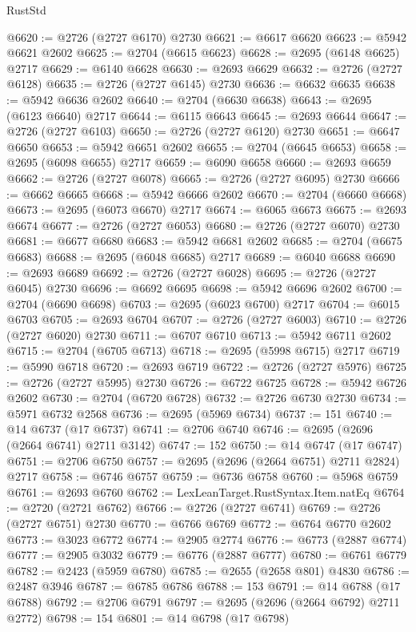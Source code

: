 \begin{lexlean}{RustStd}
\begin{coremodule}
@6620 := @2726 (@2727 @6170) @2730
@6621 := @6617 @6620
@6623 := @5942 @6621 @2602
@6625 := @2704 (@6615 @6623)
@6628 := @2695 (@6148 @6625) @2717
@6629 := @6140 @6628
@6630 := @2693 @6629
@6632 := @2726 (@2727 @6128)
@6635 := @2726 (@2727 @6145) @2730
@6636 := @6632 @6635
@6638 := @5942 @6636 @2602
@6640 := @2704 (@6630 @6638)
@6643 := @2695 (@6123 @6640) @2717
@6644 := @6115 @6643
@6645 := @2693 @6644
@6647 := @2726 (@2727 @6103)
@6650 := @2726 (@2727 @6120) @2730
@6651 := @6647 @6650
@6653 := @5942 @6651 @2602
@6655 := @2704 (@6645 @6653)
@6658 := @2695 (@6098 @6655) @2717
@6659 := @6090 @6658
@6660 := @2693 @6659
@6662 := @2726 (@2727 @6078)
@6665 := @2726 (@2727 @6095) @2730
@6666 := @6662 @6665
@6668 := @5942 @6666 @2602
@6670 := @2704 (@6660 @6668)
@6673 := @2695 (@6073 @6670) @2717
@6674 := @6065 @6673
@6675 := @2693 @6674
@6677 := @2726 (@2727 @6053)
@6680 := @2726 (@2727 @6070) @2730
@6681 := @6677 @6680
@6683 := @5942 @6681 @2602
@6685 := @2704 (@6675 @6683)
@6688 := @2695 (@6048 @6685) @2717
@6689 := @6040 @6688
@6690 := @2693 @6689
@6692 := @2726 (@2727 @6028)
@6695 := @2726 (@2727 @6045) @2730
@6696 := @6692 @6695
@6698 := @5942 @6696 @2602
@6700 := @2704 (@6690 @6698)
@6703 := @2695 (@6023 @6700) @2717
@6704 := @6015 @6703
@6705 := @2693 @6704
@6707 := @2726 (@2727 @6003)
@6710 := @2726 (@2727 @6020) @2730
@6711 := @6707 @6710
@6713 := @5942 @6711 @2602
@6715 := @2704 (@6705 @6713)
@6718 := @2695 (@5998 @6715) @2717
@6719 := @5990 @6718
@6720 := @2693 @6719
@6722 := @2726 (@2727 @5976)
@6725 := @2726 (@2727 @5995) @2730
@6726 := @6722 @6725
@6728 := @5942 @6726 @2602
@6730 := @2704 (@6720 @6728)
@6732 := @2726 @6730 @2730
@6734 := @5971 @6732 @2568
@6736 := @2695 (@5969 @6734)
@6737 := 151
@6740 := @14 @6737 (@17 @6737)
@6741 := @2706 @6740
@6746 := @2695 (@2696 (@2664 @6741) @2711 @3142)
@6747 := 152
@6750 := @14 @6747 (@17 @6747)
@6751 := @2706 @6750
@6757 := @2695 (@2696 (@2664 @6751) @2711 @2824) @2717
@6758 := @6746 @6757
@6759 := @6736 @6758
@6760 := @5968 @6759
@6761 := @2693 @6760
@6762 := LexLeanTarget.RustSyntax.Item.natEq
@6764 := @2720 (@2721 @6762)
@6766 := @2726 (@2727 @6741)
@6769 := @2726 (@2727 @6751) @2730
@6770 := @6766 @6769
@6772 := @6764 @6770 @2602
@6773 := @3023 @6772
@6774 := @2905 @2774
@6776 := @6773 (@2887 @6774)
@6777 := @2905 @3032
@6779 := @6776 (@2887 @6777)
@6780 := @6761 @6779
@6782 := @2423 (@5959 @6780)
@6785 := @2655 (@2658 @801) @4830
@6786 := @2487 @3946
@6787 := @6785 @6786
@6788 := 153
@6791 := @14 @6788 (@17 @6788)
@6792 := @2706 @6791
@6797 := @2695 (@2696 (@2664 @6792) @2711 @2772)
@6798 := 154
@6801 := @14 @6798 (@17 @6798)

\end{coremodule}
\end{lexlean}
